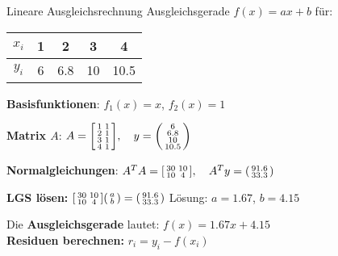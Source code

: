 \begin{example2}{Lineare Ausgleichsrechnung}
Ausgleichsgerade $f(x) = ax + b$ für:

\begin{tabular}{|c|c|c|c|c|}
\hline
$x_i$ & 1 & 2 & 3 & 4 \\
\hline
$y_i$ & 6 & 6.8 & 10 & 10.5 \\
\hline
\end{tabular}
\textbf{Basisfunktionen}: $f_1(x) = x$, $f_2(x) = 1$

\textbf{Matrix $A$}:
$A = \begin{bsmallmatrix} 1 & 1 \\ 2 & 1 \\ 3 & 1 \\ 4 & 1 \end{bsmallmatrix}, \quad y = \begin{psmallmatrix} 6 \\ 6.8 \\ 10 \\ 10.5 \end{psmallmatrix}$

\textbf{Normalgleichungen}:
$A^T A = \begin{bsmallmatrix} 30 & 10 \\ 10 & 4 \end{bsmallmatrix}, \quad A^T y = \begin{psmallmatrix} 91.6 \\ 33.3 \end{psmallmatrix}$

\textbf{LGS lösen:}
$\begin{bsmallmatrix} 30 & 10 \\ 10 & 4 \end{bsmallmatrix} \begin{psmallmatrix} a \\ b \end{psmallmatrix} = \begin{psmallmatrix} 91.6 \\ 33.3 \end{psmallmatrix}$
Lösung: $a = 1.67$, $b = 4.15$

Die \textbf{Ausgleichsgerade} lautet: $f(x) = 1.67x + 4.15$
\vspace{1mm}\\
\textbf{Residuen berechnen:} $r_i = y_i - f(x_i)$


\end{example2}
